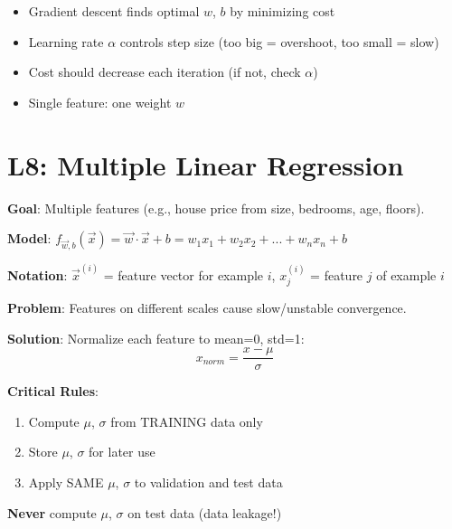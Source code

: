 \documentclass[11pt,a4paper]{article}
\begin{document}
\begin{notebox}

\begin{itemize}[leftmargin=*,nosep]
\item Gradient descent finds optimal $w$, $b$ by minimizing cost
\item Learning rate $\alpha$ controls step size (too big = overshoot, too small = slow)
\item Cost should decrease each iteration (if not, check $\alpha$)
\item Single feature: one weight $w$
\end{itemize}
\end{notebox}

\section{L8: Multiple Linear Regression}

\begin{definitionbox}

\textbf{Goal}: Multiple features (e.g., house price from size, bedrooms, age, floors).

\textbf{Model}: $f_{\vec{w},b}(\vec{x}) = \vec{w} \cdot \vec{x} + b = w_1x_1 + w_2x_2 + ... + w_nx_n + b$

\textbf{Notation}: $\vec{x}^{(i)}$ = feature vector for example $i$, $x_j^{(i)}$ = feature $j$ of example $i$
\end{definitionbox}

\begin{warningbox}

\textbf{Problem}: Features on different scales cause slow/unstable convergence.

\textbf{Solution}: Normalize each feature to mean=0, std=1:
\[x_{norm} = \frac{x - \mu}{\sigma}\]

\textbf{Critical Rules}:
\begin{enumerate}[leftmargin=*,nosep]
\item Compute $\mu$, $\sigma$ from TRAINING data only
\item Store $\mu$, $\sigma$ for later use
\item Apply SAME $\mu$, $\sigma$ to validation and test data
\end{enumerate}

\textbf{Never} compute $\mu$, $\sigma$ on test data (data leakage!)
\end{warningbox}
\end{document}
